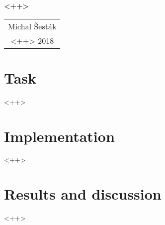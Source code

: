 \documentclass[11pt,a4paper]{article}
\begin{document}
\renewcommand{\figurename}{Fig.}
\renewcommand{\tablename}{Tab.}

\LARGE
\begin{center}
\textbf{<++>}
\end{center}\normalsize

\begin{center}
\begin{tabular}{c}
Michal Šesták \\
<++> 2018\\
\end{tabular}
\end{center}
\section{Task}
<++>
\section{Implementation}
<++>
\section{Results and discussion}
<++>
\end{document}
